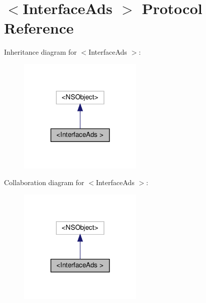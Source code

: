 \hypertarget{protocolInterfaceAds_01-p}{}\section{$<$Interface\+Ads $>$ Protocol Reference}
\label{protocolInterfaceAds_01-p}


Inheritance diagram for $<$Interface\+Ads $>$\+:
\nopagebreak
\begin{figure}[H]
\begin{center}
\leavevmode
\includegraphics[width=167pt]{protocolInterfaceAds_01-p__inherit__graph}
\end{center}
\end{figure}


Collaboration diagram for $<$Interface\+Ads $>$\+:
\nopagebreak
\begin{figure}[H]
\begin{center}
\leavevmode
\includegraphics[width=167pt]{protocolInterfaceAds_01-p__coll__graph}
\end{center}
\end{figure}
